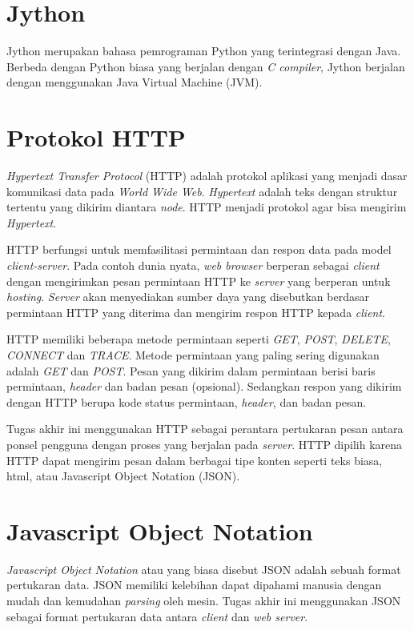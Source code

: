 \section{Jython}
Jython merupakan bahasa pemrograman Python yang terintegrasi dengan Java. Berbeda dengan Python biasa yang berjalan dengan \textit{C compiler}, Jython berjalan dengan menggunakan
Java Virtual Machine (JVM). 

\section{Protokol HTTP}
\textit{Hypertext Transfer Protocol} (HTTP) adalah protokol aplikasi yang menjadi dasar komunikasi data pada \textit{World Wide Web}. \textit{Hypertext} adalah teks dengan struktur tertentu yang dikirim diantara \textit{node}. HTTP menjadi protokol agar bisa mengirim \textit{Hypertext}.
\par
HTTP berfungsi untuk memfasilitasi permintaan dan respon data pada model \textit{client-server}. Pada contoh dunia nyata, \textit{web browser} berperan sebagai \textit{client} dengan mengirimkan pesan permintaan HTTP ke \textit{server} yang berperan untuk \textit{hosting}. \textit{Server} akan menyediakan sumber daya yang disebutkan berdasar permintaan HTTP yang diterima dan mengirim respon HTTP kepada \textit{client}.
\par
HTTP memiliki beberapa metode permintaan seperti \textit{GET}, \textit{POST}, \textit{DELETE}, \textit{CONNECT} dan \textit{TRACE}. Metode permintaan yang paling sering digunakan adalah \textit{GET} dan \textit{POST}. Pesan yang dikirim dalam permintaan berisi baris permintaan, \textit{header} dan badan pesan (opsional). Sedangkan respon yang dikirim dengan HTTP berupa kode status permintaan, \textit{header}, dan badan pesan.
\par
Tugas akhir ini menggunakan HTTP sebagai perantara pertukaran pesan antara ponsel pengguna dengan proses yang berjalan pada \textit{server}. HTTP dipilih karena HTTP dapat mengirim pesan dalam berbagai tipe konten seperti teks biasa, html, atau Javascript Object Notation (JSON).   

\section{Javascript Object Notation}
\textit{Javascript Object Notation} atau yang biasa disebut JSON adalah sebuah format pertukaran data. JSON memiliki kelebihan dapat dipahami manusia dengan mudah dan kemudahan \textit{parsing} oleh mesin. 
\newline
Tugas akhir ini menggunakan JSON sebagai format pertukaran data antara \textit{client} dan \textit{web server}.

